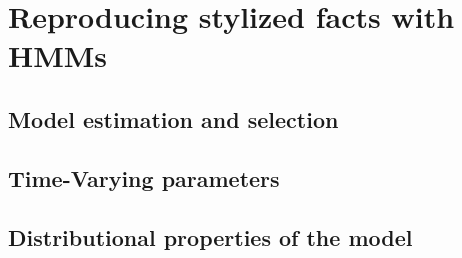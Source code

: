 \newpage

\section{Reproducing stylized facts with HMMs}
\label{Section: Stylized facts}

\subsection{Model estimation and selection}
\label{Subsection: Model estimation and selection}


\subsection{Time-Varying parameters}

 \subsection{Distributional properties of the model}
 